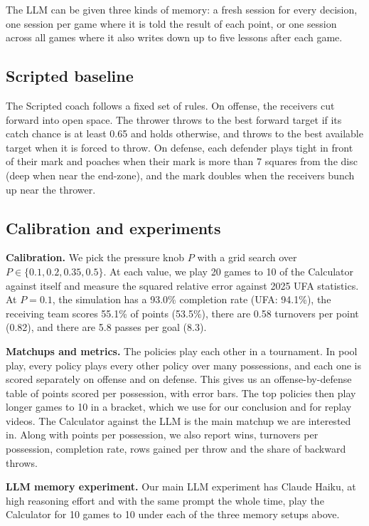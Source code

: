 \documentclass[conference]{IEEEtran}
\begin{document}
The LLM can be given three kinds of memory: a fresh session for every decision, one session per game where it is told the result of each point, or one session across all games where it also writes down up to five lessons after each game.

\subsection{Scripted baseline}
The Scripted coach follows a fixed set of rules. On offense, the receivers cut forward into open space. The thrower throws to the best forward target if its catch chance is at least 0.65 and holds otherwise, and throws to the best available target when it is forced to throw. On defense, each defender plays tight in front of their mark and poaches when their mark is more than 7 squares from the disc (deep when near the end-zone), and the mark doubles when the receivers bunch up near the thrower.

\subsection{Calibration and experiments}
\textbf{Calibration.} We pick the pressure knob $P$ with a grid search over $P\in\{0.1,0.2,0.35,0.5\}$. At each value, we play 20 games to 10 of the Calculator against itself and measure the squared relative error against 2025 UFA statistics. At $P=0.1$, the simulation has a 93.0\% completion rate (UFA: 94.1\%), the receiving team scores 55.1\% of points (53.5\%), there are 0.58 turnovers per point (0.82), and there are 5.8 passes per goal (8.3).

\textbf{Matchups and metrics.} The policies play each other in a tournament. In pool play, every policy plays every other policy over many possessions, and each one is scored separately on offense and on defense. This gives us an offense-by-defense table of points scored per possession, with error bars. The top policies then play longer games to 10 in a bracket, which we use for our conclusion and for replay videos. The Calculator against the LLM is the main matchup we are interested in. Along with points per possession, we also report wins, turnovers per possession, completion rate, rows gained per throw and the share of backward throws.

\textbf{LLM memory experiment.} Our main LLM experiment has Claude Haiku, at high reasoning effort and with the same prompt the whole time, play the Calculator for 10 games to 10 under each of the three memory setups above.
\end{document}
